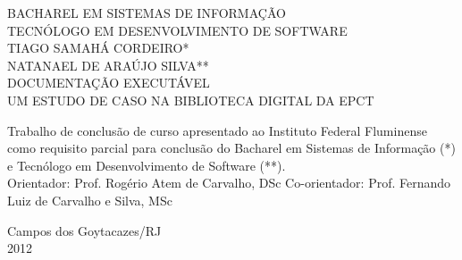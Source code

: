 \begin{titlepage}
 \begin{figure}[ht]
 \centering
 \end{figure}
 \begin{center}
   {\large BACHAREL EM SISTEMAS DE INFORMAÇÃO} \\
   {\large TECNÓLOGO EM DESENVOLVIMENTO DE SOFTWARE} \\ [3.5cm]
   {\large TIAGO SAMAHÁ CORDEIRO*} \\
   {\large NATANAEL DE ARAÚJO SILVA**} \\ [3cm]
   {\large DOCUMENTAÇÃO EXECUTÁVEL}\\ [0.5cm]
   {\small UM ESTUDO DE CASO NA BIBLIOTECA DIGITAL DA EPCT} \\ [2.5cm]
   \hspace{.45\textwidth} %
   \begin{minipage}{0.53\textwidth}
   \begin{espacosimples}
      Trabalho de conclusão de curso apresentado ao Instituto Federal Fluminense como requisito parcial para conclusão do Bacharel em Sistemas de Informação (*) e Tecnólogo em Desenvolvimento de Software (**).\\[1.5cm]
      Orientador: Prof. Rogério Atem de Carvalho, DSc
      Co-orientador: Prof. Fernando Luiz de Carvalho e Silva, MSc
    \end{espacosimples}
    \end{minipage}
   \vfill
   {\large Campos dos Goytacazes/RJ} \\
   {\large 2012}
 \end{center}
\end{titlepage}